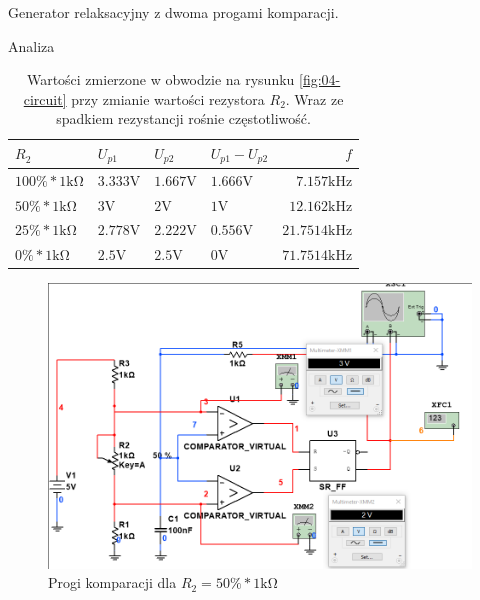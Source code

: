 \documentclass[a4paper]{scrartcl}
\begin{document}
\begin{section}{Generator relaksacyjny z dwoma progami komparacji.}
\begin{subsection}{Analiza}
				\begin{table}[!ht]
					\begin{center}
					\caption{Wartości zmierzone w obwodzie na rysunku \ref{fig:04-circuit} przy zmianie wartości rezystora $ R_{2} $. Wraz ze spadkiem rezystancji rośnie częstotliwość.}
					\begin{tabular}{| l | l | l | l | r |}
						\hline
						$ R_{2} $ & $ U_{p1} $ & $ U_{p2} $ & $ U_{p1} - U_{p2} $ & $ f $ \\ \hline
						$ 100\mathrm{\%} * 1\mathrm{k\Omega} $ & $ 3.333\mathrm{V} $ & $ 1.667\mathrm{V} $ & $ 1.666\mathrm{V} $ & $ 7.157 \mathrm{kHz} $ \\ \hline
						$ 50\mathrm{\%} * 1\mathrm{k\Omega} $ & $ 3\mathrm{V} $ & $ 2\mathrm{V} $ & $ 1\mathrm{V} $ & $ 12.162 \mathrm{kHz} $ \\ \hline
						$ 25\mathrm{\%} * 1\mathrm{k\Omega} $ & $ 2.778\mathrm{V} $ & $ 2.222\mathrm{V} $ & $ 0.556\mathrm{V} $ & $ 21.7514 \mathrm{kHz} $ \\ \hline
						$ 0\mathrm{\%} * 1\mathrm{k\Omega} $ & $ 2.5\mathrm{V} $ & $ 2.5\mathrm{V} $ & $ 0\mathrm{V} $ & $ 71.7514 \mathrm{kHz} $ \\ \hline
					\end{tabular}
					\end{center}
				\end{table}

				\begin{figure}[!ht]
					\begin{center}
						\includegraphics[width=.75\linewidth]{04-base-progi}
						\caption{Progi komparacji dla $ R_{2} = 50\%*1\mathrm{k\Omega}$ }
					\end{center}
				\end{figure}


\end{subsection}
\end{section}
\end{document}
